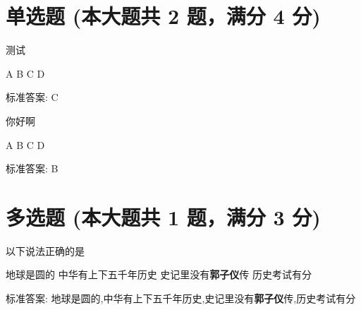 \documentclass[12pt, a4paper, addpoints]{exam}
\begin{document}
\begin{center}
\end{center}
\vspace{5mm}

\normalsize
\vspace{5mm}

\section{单选题 (本大题共 2 题，满分 4 分)}
\hspace{1.5cm}
\begin{questions}
\question[2] 测试

\begin{oneparchoices}
\choice A
\choice B
\choice C
\choice D
\end{oneparchoices}

标准答案: C

\question[2] 你好啊

\begin{oneparchoices}
\choice A
\choice B
\choice C
\choice D
\end{oneparchoices}

标准答案: B

\end{questions}

\hspace{5cm}

\section{多选题 (本大题共 1 题，满分 3 分)}
\hspace{1.5cm}
\begin{questions}
\question[3] 以下说法正确的是

\begin{checkboxes}
\choice 地球是圆的
\choice 中华有上下五千年历史
\choice 史记里没有\textbf{郭子仪}传
\choice 历史考试有\textit{}分
\end{checkboxes}

标准答案: 地球是圆的,中华有上下五千年历史,史记里没有\textbf{郭子仪}传,历史考试有\textit{}分

\end{questions}

\hspace{5cm}
\end{document}
